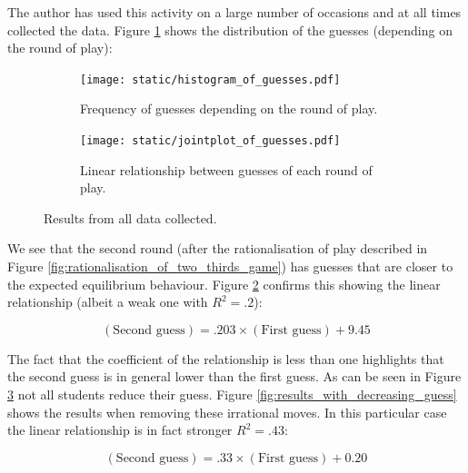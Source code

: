 \documentclass[12pt]{article}
\begin{document}
The author has used this activity on a large number of occasions and at all
times collected the data. Figure \ref{fig:histogram_of_guess} shows the
distribution of the guesses (depending on the round of play):

\begin{figure}[!hbtp]
    \begin{subfigure}{.6\textwidth}
        \centering
        \texttt{[image: static/histogram\_of\_guesses.pdf]}
        \caption{Frequency of guesses depending on the round of play.}
        \label{fig:histogram_of_guess}
    \end{subfigure}
    \begin{subfigure}{.4\textwidth}
        \centering
        \texttt{[image: static/jointplot\_of\_guesses.pdf]}
        \caption{Linear relationship between guesses of each round of play.}
        \label{fig:jointplot_of_guess}
    \end{subfigure}
    \caption{Results from all data collected.}
    \label{fig:all_results}
\end{figure}

We see that the second round (after the rationalisation of play described in
Figure \ref{fig:rationalisation_of_two_thirds_game}) has guesses that are closer
to the expected equilibrium behaviour.
Figure \ref{fig:jointplot_of_guess} confirms this showing the linear
relationship (albeit a weak one with \(R^2=.2\)):

\begin{equation}
    (\text{Second guess}) = .203\times(\text{First guess}) + 9.45
    \label{eq:linear_relationship}
\end{equation}

The fact that the coefficient of the relationship is less than one highlights
that the second guess is in general lower than the first guess. As can be seen
in Figure \ref{fig:all_results} not all students reduce their guess. Figure
\ref{fig:results_with_decreasing_guess} shows the results when removing these
irrational moves. In this particular case the linear relationship is in fact
stronger \(R^2=.43\):

\begin{equation}
    (\text{Second guess}) = .33\times(\text{First guess}) + 0.20
    \label{eq:linear_relationship_for_increasing_guesses}
\end{equation}
\end{document}
